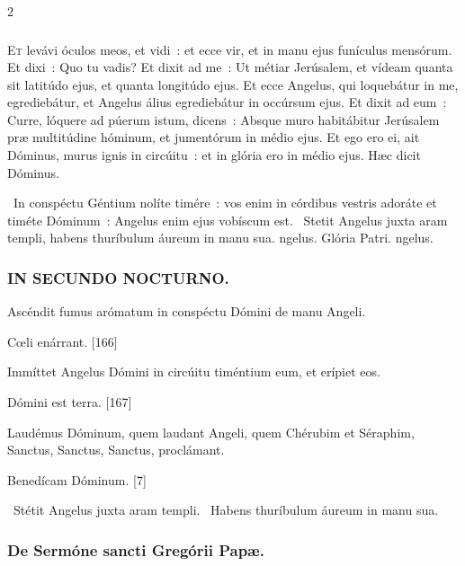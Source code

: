 \documentclass[9pt,twoside]{extarticle}
\begin{document}
\begin{multicols}{2}
{\subsubsection*{\center {}}
\lettrine{E}t levávi óculos meos, et vidi~: et ecce vir, et in manu ejus funículus mensórum.
Et dixi~: Quo tu vadis? Et dixit ad me~: Ut métiar Jerúsalem, et vídeam quanta sit latitúdo ejus, et quanta longitúdo ejus.
Et ecce Angelus, qui loquebátur in me, egrediebátur, et Angelus álius egrediebátur in occúrsum ejus.
Et dixit ad eum~: Curre, lóquere ad púerum istum, dicens~: Absque muro habitábitur Jerúsalem præ multitúdine hóminum, et jumentórum in médio ejus.
Et ego ero ei, ait Dóminus, murus ignis in circúitu~: et in glória ero in médio ejus. Hæc dicit Dóminus.

\begin{tightlist}{}
\item {}~In conspéctu Géntium nolíte timére~: vos enim in córdibus vestris adoráte et timéte Dóminum~: \textred{*} Angelus enim ejus vobíscum est. ~Stetit Angelus juxta aram templi, habens thuríbulum áureum in manu sua. ngelus. Glória Patri. ngelus.
\end{tightlist}

\subsubsection*{\center \textsc{IN SECUNDO NOCTURNO.}}
\begin{tightlist}{}
\item {} Ascéndit fumus arómatum in conspéctu Dómini de manu Angeli.
\item {} Cœli enárrant. [166]
\item {} Immíttet Angelus Dómini in circúitu timéntium eum, et erípiet eos.
\item {} Dómini est terra. [167]
\item {} Laudémus Dóminum, quem laudant Angeli, quem Chérubim et Séraphim, Sanctus, Sanctus, Sanctus, proclámant.
\item {} Benedícam Dóminum. [7]
\item {}~Stétit Angelus juxta aram templi. ~Habens thuríbulum áureum in manu sua.
\end{tightlist}

\subsubsection*{\center De Sermóne sancti Gregórii Papæ.}
}
\end{multicols}
\end{document}
